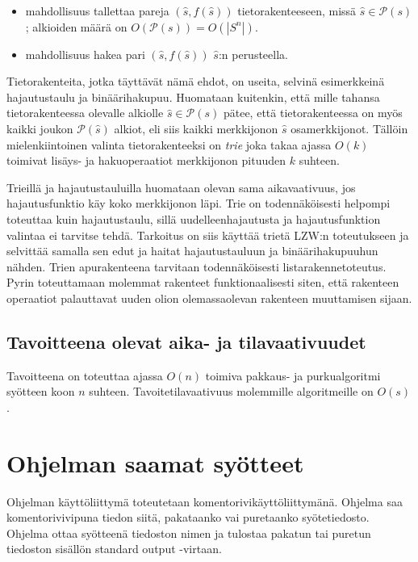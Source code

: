 \documentclass{article}
\begin{document}
\begin{itemize}
  \item mahdollisuus tallettaa pareja $(\hat{s}, f(\hat{s}))$ tietorakenteeseen, missä $\hat{s} \in \mathcal{P}(s)$; alkioiden määrä on $O(\mathcal{P}(s)) = O(|S^n|)$.
  \item mahdollisuus hakea pari $(\hat{s}, f(\hat{s}))$ $\hat{s}$:n perusteella.
\end{itemize}

Tietorakenteita, jotka täyttävät nämä ehdot, on useita, selvinä esimerkkeinä hajautustaulu ja binäärihakupuu. Huomataan kuitenkin, että mille tahansa tietorakenteessa olevalle alkiolle $\hat{s} \in \mathcal{P}(s)$ pätee, että tietorakenteessa on myös kaikki joukon $\mathcal{P}(\hat{s})$ alkiot, eli siis kaikki merkkijonon $\hat{s}$ osamerkkijonot. Tällöin mielenkiintoinen valinta tietorakenteeksi on \textit{trie}  joka takaa ajassa $O(k)$ toimivat lisäys- ja hakuoperaatiot merkkijonon pituuden $k$ suhteen. \cite{Knuth1}\cite{Navarro1}

Trieillä ja hajautustauluilla huomataan olevan sama aikavaativuus, jos hajautusfunktio käy koko merkkijonon läpi. Trie on todennäköisesti helpompi toteuttaa kuin hajautustaulu, sillä uudelleenhajautusta ja hajautusfunktion valintaa ei tarvitse tehdä. Tarkoitus on siis käyttää trietä LZW:n toteutukseen ja selvittää samalla sen edut ja haitat hajautustauluun ja binäärihakupuuhun nähden. Trien apurakenteena tarvitaan todennäköisesti listarakennetoteutus. Pyrin toteuttamaan molemmat rakenteet funktionaalisesti siten, että rakenteen operaatiot palauttavat uuden olion olemassaolevan rakenteen muuttamisen sijaan.

\subsection{Tavoitteena olevat aika- ja tilavaativuudet}

Tavoitteena on toteuttaa ajassa $O(n)$ toimiva pakkaus- ja purkualgoritmi syötteen koon $n$ suhteen. \cite{Navarro1} Tavoitetilavaativuus molemmille algoritmeille on $O(s)$.

\section{Ohjelman saamat syötteet}

Ohjelman käyttöliittymä toteutetaan komentorivikäyttöliittymänä. Ohjelma saa komentorivivipuna tiedon siitä, pakataanko vai puretaanko syötetiedosto. Ohjelma ottaa syötteenä tiedoston nimen ja tulostaa pakatun tai puretun tiedoston sisällön standard output -virtaan.

\printbibliography
\end{document}
